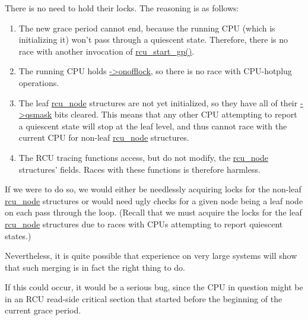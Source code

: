 
	There is no need to hold their locks.
	The reasoning is as follows:
	\begin{enumerate}
	\item	The new grace period cannot end, because the running CPU
		(which is initializing it) won't pass through a
		quiescent state.
		Therefore, there is no race with another invocation
		of \url{rcu_start_gp()}.
	\item	The running CPU holds \url{->onofflock}, so there
		is no race with CPU-hotplug operations.
	\item	The leaf \url{rcu_node} structures are not yet initialized,
		so they have all of their \url{->qsmask} bits cleared.
		This means that any other CPU attempting to report
		a quiescent state will stop at the leaf level,
		and thus cannot race with the current CPU for non-leaf
		\url{rcu_node} structures.
	\item	The RCU tracing functions access, but do not modify,
		the \url{rcu_node} structures' fields.
		Races with these functions is therefore harmless.
	\end{enumerate}


	If we were to do so, we would either be needlessly acquiring locks
	for the non-leaf \url{rcu_node} structures or would need
	ugly checks for a given node being a leaf node on each pass
	through the loop.
	(Recall that we must acquire the locks for the leaf
	\url{rcu_node} structures due to races with CPUs attempting
	to report quiescent states.)

	Nevertheless, it is quite possible that experience on very large
	systems will show that such merging is in fact the right thing
	to do.


	If this could occur, it would be a serious bug, since the
	CPU in question might be in an RCU read-side critical section
	that started before the beginning of the current grace period.

